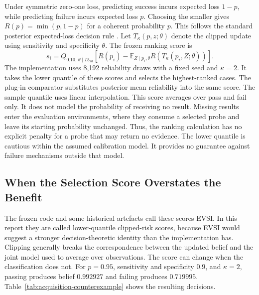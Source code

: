 Under symmetric zero-one loss, predicting success incurs expected loss $1-p$, while predicting failure incurs expected loss $p$.
Choosing the smaller gives $R(p)=\min(p,1-p)$ for a coherent probability $p$. This follows the standard posterior expected-loss
decision rule \parencite[Section~5.7, pp.~176--177]{murphy2012machine}.
Let $T_\kappa(p,z;\theta)$ denote the clipped update using sensitivity and specificity $\theta$. The frozen ranking score is
\begin{equation}
 s_i=Q_{0.10,\,\theta\mid D_{\mathrm{cal}}}
 \left[R(p_i)-\mathbb{E}_{Z\mid p_i,\theta}
 R\!\left(T_\kappa(p_i,Z;\theta)\right)\right].
\end{equation}
The implementation uses 8,192 reliability draws with a fixed seed and $\kappa=2$. It takes the lower quantile of these scores
and selects the highest-ranked cases. The plug-in comparator substitutes posterior mean reliability into the same score.
The sample quantile uses linear interpolation. This score averages over pass and fail only. It does not model the probability
of receiving no result. Missing results enter the evaluation environments, where they consume a selected probe and leave its
starting probability unchanged. Thus, the ranking calculation has no explicit penalty for a probe that may return no evidence.
The lower quantile is cautious within the assumed calibration model. It provides no guarantee against failure mechanisms
outside that model.

\subsection{When the Selection Score Overstates the Benefit}

The frozen code and some historical artefacts call these scores EVSI. In this report they are called lower-quantile clipped-risk
scores, because EVSI would suggest a stronger decision-theoretic identity than the implementation has. Clipping generally breaks the correspondence between
the updated belief and the joint model used to average over observations. The score can change when the classification does not.
For $p=0.95$, sensitivity and specificity $0.9$, and $\kappa=2$, passing produces belief $0.992927$ and failing produces
$0.719995$. Table~\ref{tab:acquisition-counterexample} shows the resulting decisions.

